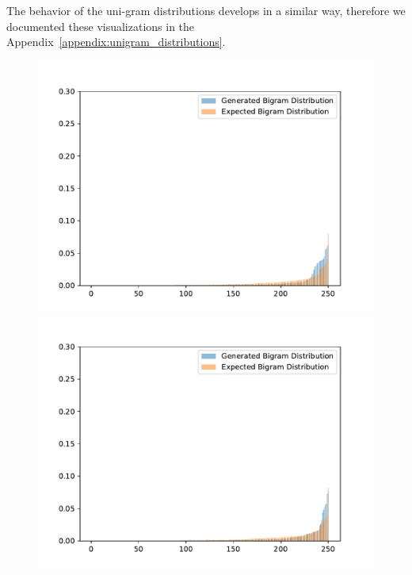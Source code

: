 The behavior of the uni-gram distributions develops in a similar way, therefore we documented these visualizations in the Appendix~\ref{appendix:unigram_distributions}.

\begin{figure}[H]
	\includegraphics[width=\linewidth]{img/plots/reddit/bigram_distribution_comparison_step_500000.pdf}
	\centering
	\small
	\endminipage\hfill
	\includegraphics[width=\linewidth]{img/plots/reddit/bigram_distribution_comparison_step_1000000.pdf}
	\centering
	\small
	\endminipage\hfill

\end{figure}
